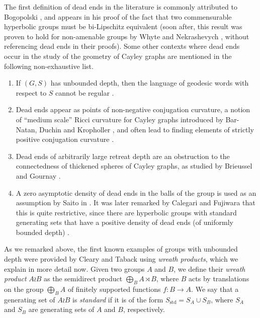 \documentclass[reqno,oneside]{amsart}
\newcommand{\std}{S_{\mathrm{std}}}
\theoremstyle{plain}
\theoremstyle{definition}
\begin{document}
The first definition of dead ends in the literature is commonly attributed to Bogopolski \cite{Bogopolski97}, and appears in his proof of the fact that two commensurable hyperbolic groups must be bi-Lipschitz equivalent (soon after, this result was proven to hold for non-amenable groups by Whyte \cite{Whyte99} and Nekrashevych \cite{Nekrashevych98}, without referencing dead ends in their proofs). Some other contexts where dead ends occur in the study of the geometry of Cayley graphs are mentioned in the following non-exhaustive list.
\begin{enumerate}
	\item If $(G,S)$ has unbounded depth, then the language of geodesic words with respect to $S$ cannot be regular \cite{warshall2010deep}.
	
	\item Dead ends appear as points of non-negative conjugation curvature, a notion of ``medium scale'' Ricci curvature for Cayley graphs introduced by Bar-Natan, Duchin and Kropholler \cite{BarNatanDuchinKro2020}, and often lead to finding elements of strictly positive conjugation curvature \cite{kropholler2020mediumscale}.
	
	\item Dead ends of arbitrarily large retreat depth are an obstruction to the connectedness of thickened spheres of Cayley graphs, as studied by Brieussel and Gournay \cite{BG18}.
	
	\item A zero asymptotic density of dead ends in the balls of the group is used as an assumption by Saito in \cite[Section 11.2, Assumption 2. \textbf{S}]{Saito10}. It was later remarked by Calegari and Fujiwara that this is quite restrictive, since there are hyperbolic groups with standard generating sets that have a positive density of dead ends (of uniformly bounded depth) \cite{CF15}.
\end{enumerate}



As we remarked above, the first known examples of groups with unbounded depth were provided by Cleary and Taback \cite{ClearyTaback05} using \textit{wreath products}, which we explain in more detail now. Given two groups $A$ and $B$, we define their \textit{wreath product} $A\wr B$ as the semidirect product $\bigoplus_{B} A\rtimes B$, where $B$ acts by translations on the group $\bigoplus_{B} A$ of finitely supported functions $f:B\to A$. We say that a generating set of $A\wr B$ is \textit{standard} if it is of the form $\std=S_A\cup S_B$, where $S_A$ and $S_B$ are generating sets of $A$ and $B$, respectively. 
\end{document}
